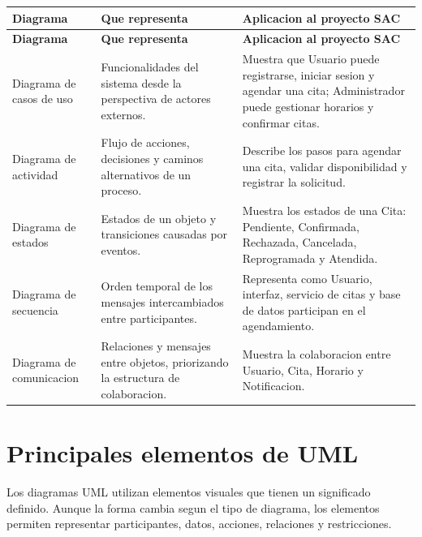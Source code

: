 \documentclass[12pt,letterpaper]{article}
\begin{document}
\begin{longtable}{|p{3.7cm}|p{5cm}|p{6.4cm}|}
\hline
\textbf{Diagrama} & \textbf{Que representa} & \textbf{Aplicacion al proyecto SAC} \\
\hline
\endfirsthead
\hline
\textbf{Diagrama} & \textbf{Que representa} & \textbf{Aplicacion al proyecto SAC} \\
\hline
\endhead
\hline
\endfoot
\hline
\endlastfoot

Diagrama de casos de uso & Funcionalidades del sistema desde la perspectiva de actores externos. & Muestra que Usuario puede registrarse, iniciar sesion y agendar una cita; Administrador puede gestionar horarios y confirmar citas. \\
\hline

Diagrama de actividad & Flujo de acciones, decisiones y caminos alternativos de un proceso. & Describe los pasos para agendar una cita, validar disponibilidad y registrar la solicitud. \\
\hline

Diagrama de estados & Estados de un objeto y transiciones causadas por eventos. & Muestra los estados de una Cita: Pendiente, Confirmada, Rechazada, Cancelada, Reprogramada y Atendida. \\
\hline

Diagrama de secuencia & Orden temporal de los mensajes intercambiados entre participantes. & Representa como Usuario, interfaz, servicio de citas y base de datos participan en el agendamiento. \\
\hline

Diagrama de comunicacion & Relaciones y mensajes entre objetos, priorizando la estructura de colaboracion. & Muestra la colaboracion entre Usuario, Cita, Horario y Notificacion. \\
\hline
\end{longtable}

\section{Principales elementos de UML}

Los diagramas UML utilizan elementos visuales que tienen un significado definido. Aunque la forma cambia segun el tipo de diagrama, los elementos permiten representar participantes, datos, acciones, relaciones y restricciones.
\end{document}
